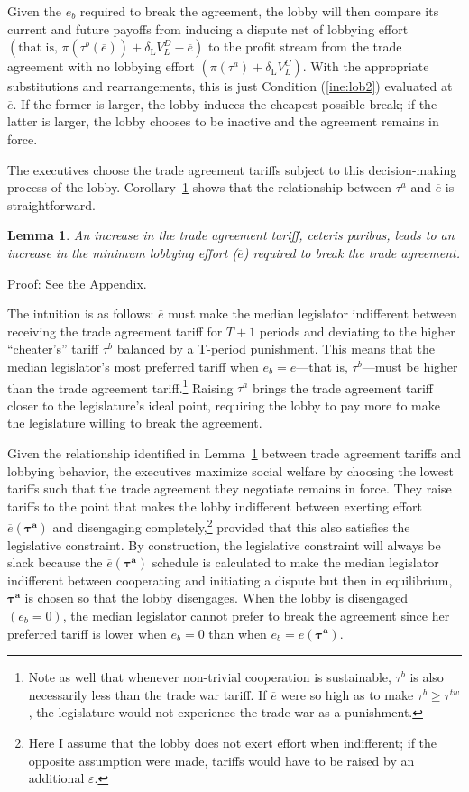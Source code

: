 \documentclass[authoryear, review]{elsarticle}
\newtheorem{lemma}{Lemma}
\newcommand{\ov}{\overline}
\newcommand{\bta}{\bm{\tau^a}}
\newcommand{\de}{\delta}
\begin{document}
Given the $e_b$ required to break the agreement, the lobby will then compare its current and future payoffs from inducing a dispute net of lobbying effort $\left(\text{that is, }\pi(\tau^b(\ov{e})) + \de_\text{L} V^D_L - \ov{e}\right)$ to the profit stream from the trade agreement with no lobbying effort $\left(\pi(\tau^a) + \de_\text{L} V^C_L\right)$. With the appropriate substitutions and rearrangements, this is just Condition (\ref{ine:lob2}) evaluated at $\ov{e}$. If the former is larger, the lobby induces the cheapest possible break; if the latter is larger, the lobby chooses to be inactive and the agreement remains in force.

The executives choose the trade agreement tariffs subject to this decision-making process of the lobby. Corollary~\ref{cor:et} shows that the relationship between $\tau^a$ and $\ov{e}$ is straightforward. 
\begin{lemma}
  An increase in the trade agreement tariff, \emph{ceteris paribus}, leads to an increase in the minimum lobbying effort ($\ov{e}$) required to break the trade agreement.
  \label{cor:et}
\end{lemma}

Proof: See the \hyperlink{Cor_et}{Appendix}.

\noindent The intuition is as follows: $\ov{e}$ must make the median legislator indifferent between receiving the trade agreement tariff for $T+1$ periods and deviating to the higher ``cheater's'' tariff $\tau^b$ balanced by a T-period punishment. This means that the median legislator's most preferred tariff when $e_b=\ov{e}$---that is, $\tau^b$---must be higher than the trade agreement tariff.\footnote{Note as well that whenever non-trivial cooperation is sustainable, $\tau^b$ is also necessarily less than the trade war tariff. If $\ov{e}$ were so high as to make $\tau^b \geq \tau^{tw}$, the legislature would not experience the trade war as a punishment.} Raising $\tau^a$ brings the trade agreement tariff closer to the legislature's ideal point, requiring the lobby to pay more to make the legislature willing to break the agreement.

Given the relationship identified in Lemma~\ref{cor:et} between trade agreement tariffs and lobbying behavior, the executives maximize social welfare by choosing the lowest tariffs such that the trade agreement they negotiate remains in force. They raise tariffs to the point that makes the lobby indifferent between exerting effort $\ov{e}(\bta)$ and disengaging completely,\footnote{Here I assume that the lobby does not exert effort when indifferent; if the opposite assumption were made, tariffs would have to be raised by an additional $\varepsilon$.} provided that this also satisfies the legislative constraint. By construction, the legislative constraint will always be slack because the $\ov{e}(\bta)$ schedule is calculated to make the median legislator indifferent between cooperating and initiating a dispute but then in equilibrium, $\bta$ is chosen so that the lobby disengages. When the lobby is disengaged $\left(e_b=0\right)$, the median legislator cannot prefer to break the agreement since her preferred tariff is lower when $e_b=0$ than when $e_b=\ov{e}(\bta)$.
\end{document}
